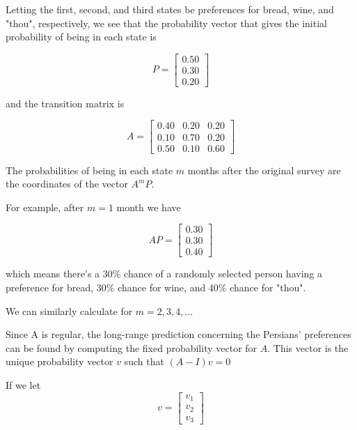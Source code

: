 \documentclass{amsart}
\theoremstyle{definition}
\theoremstyle{remark}
\numberwithin{equation}{section}
\begin{document}
Letting the first, second, and third states be preferences for bread, wine, and "thou", respectively, we see that the probability vector that gives the initial probability of being in each state is

\begin{equation}
    P = \begin{bmatrix}
           0.50 \\
           0.30 \\
           0.20
         \end{bmatrix}
\end{equation}

and the transition matrix is

\begin{equation}
    A = \begin{bmatrix}
           0.40 & 0.20 & 0.20  \\
           0.10 & 0.70 & 0.20 \\
           0.50 & 0.10 & 0.60
         \end{bmatrix}
\end{equation}

The probabilities of being in each state $m$ months after the original survey are the coordinates of the vector $A^mP$.

For example, after $m = 1$ month we have 

\begin{equation}
    AP = \begin{bmatrix}
           0.30 \\
           0.30 \\
           0.40
         \end{bmatrix}
\end{equation}

which means there's a 30\% chance of a randomly selected person having a preference for bread, 30\% chance for wine, and 40\% chance for "thou".

We can similarly calculate for $m = 2, 3, 4, \ldots $

Since A is regular, the long-range prediction concerning the Persians' preferences can be found by computing the fixed probability vector for $A$. 
This vector is the unique probability vector $v$ such that $(A - I)v = 0$

If we let 
\begin{equation}
    v = \begin{bmatrix}
           v_1 \\
           v_2 \\
           v_3


         \end{bmatrix}
\end{equation}
\end{document}
